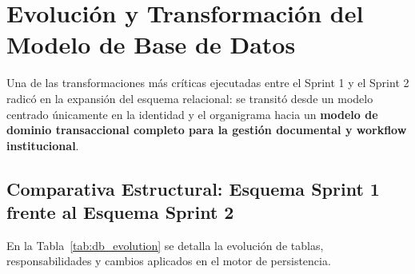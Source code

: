\documentclass[a4paper,12pt]{article}
\begin{document}
\section{Evolución y Transformación del Modelo de Base de Datos}

Una de las transformaciones más críticas ejecutadas entre el Sprint 1 y el Sprint 2 radicó en la expansión del esquema relacional: se transitó desde un modelo centrado únicamente en la identidad y el organigrama hacia un \textbf{modelo de dominio transaccional completo para la gestión documental y workflow institucional}.

\subsection{Comparativa Estructural: Esquema Sprint 1 frente al Esquema Sprint 2}
En la Tabla~\ref{tab:db_evolution} se detalla la evolución de tablas, responsabilidades y cambios aplicados en el motor de persistencia.
\end{document}
